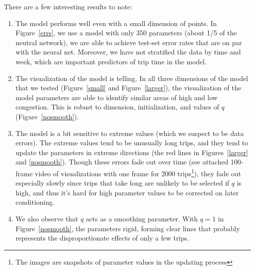 \documentclass[11pt]{article}
\begin{document}
There are a few interesting results to note:
\begin{enumerate}
    \item The model performs well even with a small dimension of points. In Figure~\ref{errs}, we use a model with only 350 parameters (about 1/5 of the neutral network), we are able to achieve test-set error rates that are on par with the neural net. Moreover, we have not stratified the data by time and week, which are important predictors of trip time in the model.
    \item The visualization of the model is telling. In all three dimensions of the model that we tested (Figure~\ref{small} and Figure~\ref{larger}), the visualization of the model parameters are able to identify similar areas of high and low congestion. This is robust to dimension, initialization, and values of $q$ (Figure~\ref{nosmooth}). 
    \item The model is a bit sensitive to extreme values (which we suspect to be data errors). The extreme values tend to be unusually long trips, and they tend to update the parameters in extreme directions (the red lines in Figures~\ref{larger} and \ref{nosmooth}). Though these errors fade out over time (see attached 100-frame video of visualizations with one frame for 2000 trips\footnote{The images are snapshots of parameter values in the updating process}), they fade out especially slowly since trips that take long are unlikely to be selected if $q$ is high, and thus it's hard for high parameter values to be corrected on later conditioning.
    \item We also observe that $q$ acts as a smoothing parameter. With $q=1$ in Figure~\ref{nosmooth}, the parameters rigid, forming clear lines that probably represents the disproportionate effects of only a few trips.
\end{enumerate}
\end{document}
